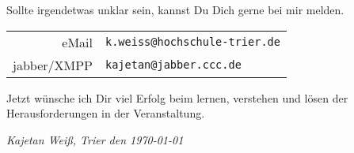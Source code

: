 Sollte irgendetwas unklar sein, kannst Du Dich gerne bei mir melden. 
\begin{center}
\begin{tabular}{rl}
eMail & \texttt{k.weiss@hochschule-trier.de} \\
jabber/XMPP & \texttt{kajetan@jabber.ccc.de} \\ 
\end{tabular}
\end{center}

Jetzt wünsche ich Dir viel Erfolg beim lernen, verstehen und lösen der Herausforderungen in der Veranstaltung.

\vspace{0.5cm}

\textsl{Kajetan Weiß, Trier den \today}
